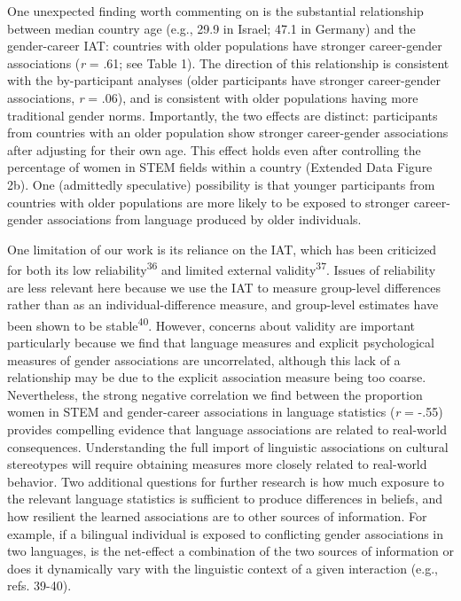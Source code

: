 \documentclass[11pt]{wlscirep}
\begin{document}
One unexpected finding worth commenting on is the substantial relationship between median country age (e.g., 29.9 in Israel; 47.1 in Germany) and the gender-career IAT: countries with older populations have stronger career-gender associations (\emph{r} = .61; see Table 1). The direction of this relationship is consistent with the by-participant analyses (older participants have stronger career-gender associations, \emph{r} = .06), and is consistent with older populations having more traditional gender norms. Importantly, the two effects are distinct: participants from countries with an older population show stronger career-gender associations after adjusting for their own age. This effect holds even after controlling the percentage of women in STEM fields within a country (Extended Data Figure 2b). One (admittedly speculative) possibility is that younger participants from countries with older populations are more likely to be exposed to stronger career-gender associations from language produced by older individuals.



One limitation of our work is its reliance on the IAT, which has been criticized for both its low reliability\textsuperscript{36} and limited external validity\textsuperscript{37}. Issues of reliability are less relevant here because we use the IAT to measure group-level differences rather than as an individual-difference measure, and group-level estimates have been shown to be stable\textsuperscript{40}. However, concerns about validity are important particularly because we find that language measures and explicit psychological measures of gender associations are uncorrelated, although this lack of a relationship may be due to the explicit association measure being too coarse. Nevertheless, the strong negative correlation we find between the proportion women in STEM and gender-career associations in language statistics (\emph{r} = -.55) provides compelling evidence that language associations are related to real-world consequences. Understanding the full import of linguistic associations on cultural stereotypes will require obtaining measures more closely related to real-world behavior. Two additional questions for further research is how much exposure to the relevant language statistics is sufficient to produce differences in beliefs, and how resilient the learned associations are to other sources of information. For example, if a bilingual individual is exposed to conflicting gender associations in two languages, is the net-effect a combination of the two sources of information or does it dynamically vary with the linguistic context of a given interaction (e.g., refs. 39-40).
\end{document}
